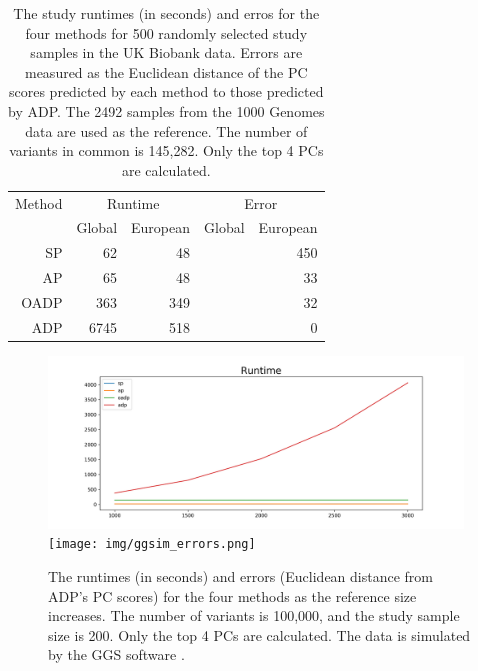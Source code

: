 \documentclass{article}
\begin{document}
\begin{table}[h]
  \centering
  \begin{tabular}{|r|r|r|r|r|}
    \hline
    Method & \multicolumn{2}{|c|}{Runtime} & \multicolumn{2}{|c|}{Error} \\
    & Global & European & Global & European \\
    \hline
    SP         &  62   & 48  &     & 450 \\ 
    AP         &  65   & 48  &     & 33  \\
    OADP       &  363  & 349 &     & 32  \\
    ADP        &  6745 & 518 &     & 0   \\
    \hline
  \end{tabular}
  \caption{
    The study runtimes (in seconds) and erros for the four methods
    for 500 randomly selected study samples
    in the UK Biobank data.
    Errors are measured as the Euclidean distance of
    the PC scores predicted by each method
    to those predicted by ADP.
    The 2492 samples from the 1000 Genomes data
    are used as the reference.
    The number of variants in common is 145,282.
    Only the top 4 PCs are calculated.
    }
\end{table}

\begin{figure}[h]
  \centering
  \includegraphics[width=0.98\textwidth]{img/ggsim_runtimes.png}
  \texttt{[image: img/ggsim\_errors.png]}
  \caption{
    The runtimes (in seconds) and errors (Euclidean distance from ADP's PC scores) for the four methods
    as the reference size increases.
    The number of variants is 100,000,
    and the study sample size is 200.
    Only the top 4 PCs are calculated.
    The data is simulated by the GGS software \citep{mathieson2012differential}.
  }
\end{figure}
\end{document}
